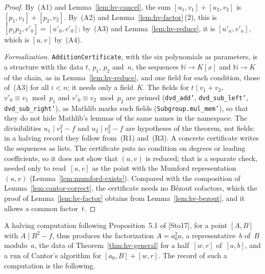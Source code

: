 \begin{proof}
\leanok
{}
By~(A1) and Lemma~\ref{lem:hv-cancel}, the sum $[u_1, v_1] + [u_2, v_2]$ is
$[p_1, v_1] + [p_2, v_2]$. By~(A2) and Lemma~\ref{lem:hv-factor}\,(2), this is
$[p_1 p_2, v'_0] = [u'_0, v'_0]$; by~(A3) and Lemma~\ref{lem:hv-reduce}, it is $[u'_n, v'_n]$,
which is $[u, v]$ by~(A4).

\emph{Formalization.} \texttt{AdditionCertificate}, with the six polynomials as parameters, is a
structure with the data $t$, $p_1$, $p_2$ and~$n$, the sequences $\mathbb N \to K[x]$ and
$\mathbb N \to K$ of the chain, as in Lemma~\ref{lem:hv-reduce}, and one field for each condition,
those of~(A3) for all $i < n$; it needs only a field~$K$. The fields for $t \mid v_1 + v_2$,
$v'_0 \equiv v_1 \bmod p_1$ and $v'_0 \equiv v_2 \bmod p_2$ are primed (\texttt{dvd\_add'},
\texttt{dvd\_sub\_left'}, \texttt{dvd\_sub\_right'}), as Mathlib marks such fields
(\texttt{Subgroup.mul\_mem'}), so that they do not hide Mathlib's lemmas of the same names in the
namespace. The divisibilities $u_1 \mid v_1^2 - f$ and $u_2 \mid v_2^2 - f$ are hypotheses of the
theorem, not fields: in a halving record they follow from~(R1) and~(R3). A concrete certificate
writes the sequences as lists. The certificate puts no condition on degrees or leading coefficients,
so it does not show that $(u, v)$ is reduced; that is a separate check, needed only to read~$[u, v]$
as the point with the Mumford representation $(u, v)$ (Lemma~\ref{lem:mumford-exists}). Compared
with the composition of Lemma~\ref{lem:cantor-correct}, the certificate needs no B\'ezout cofactors,
which the proof of Lemma~\ref{lem:hv-factor} obtains from Lemma~\ref{lem:hv-bezout}, and it allows a
common factor~$t$.
\end{proof}

A halving computation following Proposition~5.1 of [Sto17], for a point $[A, B]$ with
$A \mid B^2 - f$, thus produces the factorization $A = a_0^2 a$, a representative~$b$ of~$B$
modulo~$a$, the data of Theorem~\ref{thm:hv-general} for a half~$[w, r]$ of~$[a, b]$, and a run of
Cantor's algorithm for $[a_0, B] + [w, r]$. The record of such a computation is the following.

